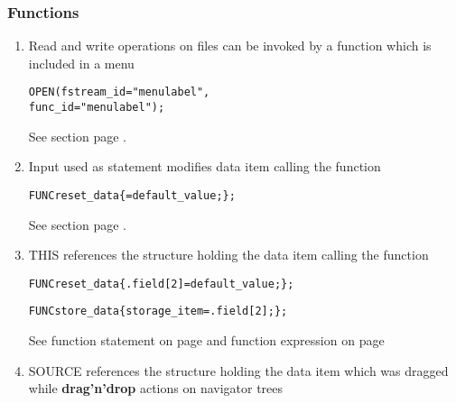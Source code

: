 \subsubsection{Functions}
\begin{enumerate}

\item Read and write operations on files can be invoked
  by a function which is included in a menu

\begin{boxedminipage}[t]{\linewidth}
\begin{alltt}
  \MENU OPEN ( fstream_id = "menu label",
              \FUNC{} func_id = "menu label" );
\end{alltt}
\end{boxedminipage}

See section  page \pageref{uifilemenu}. \\

\item Input used as statement modifies data item calling the function

\begin{boxedminipage}[t]{\linewidth}
\begin{alltt}
  FUNC reset_data \{ \INPUT{} = default_value; \};
\end{alltt}
\end{boxedminipage}

See section  page \pageref{fudatastatements}. \\
\item THIS references the structure holding the data item calling the function

\begin{boxedminipage}[t]{\linewidth}
\begin{alltt}
  FUNC reset_data \{ \THIS.field[2] = default_value; \};

  FUNC store_data \{ storage_item = \THIS.field[2]; \};

\end{alltt}
\end{boxedminipage}

See function statement on page \pageref{fudatastatements} 
and function expression on page \pageref{fuexpressionsdata} \\
\item SOURCE references the structure holding the data item
which was dragged while {\bfseries drag'n'drop} actions on navigator trees


\end{enumerate}
